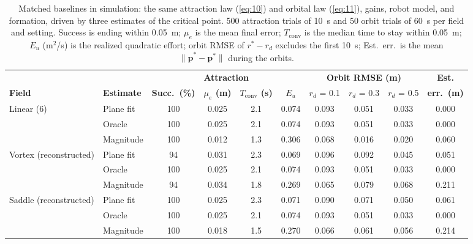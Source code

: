 \begin{table}[!t]
\centering
\footnotesize
\caption{Matched baselines in simulation: the same attraction law (\ref{eq:10}) and orbital law (\ref{eq:11}), gains, robot model, and formation, driven by three estimates of the critical point. 500 attraction trials of 10~s and 50 orbit trials of 60~s per field and setting. Success is ending within 0.05~m; $\mu_e$ is the mean final error; $T_{\mathrm{conv}}$ is the median time to stay within 0.05~m; $E_u$ (m$^2$/s) is the realized quadratic effort; orbit RMSE of $r^* - r_d$ excludes the first 10~s; Est.\ err.\ is the mean $\|\hat{\mathbf{p}}^* - \mathbf{p}^*\|$ during the orbits.}
\label{tab:baselines}
\setlength{\tabcolsep}{2.5pt}
\begin{tabular}{llcccc|ccc|c}
\hline
 & & \multicolumn{4}{c|}{\textbf{Attraction}} & \multicolumn{3}{c|}{\textbf{Orbit RMSE (m)}} & \textbf{Est.} \\
\textbf{Field} & \textbf{Estimate} & \textbf{Succ.\ (\%)} & \textbf{$\mu_e$ (m)} & \textbf{$T_{\mathrm{conv}}$ (s)} & \textbf{$E_u$} & $r_d$ = 0.1 & $r_d$ = 0.3 & $r_d$ = 0.5 & \textbf{err.\ (m)} \\
\hline
Linear (6) & Plane fit & 100 & 0.025 & 2.1 & 0.074 & 0.093 & 0.051 & 0.033 & 0.000 \\
 & Oracle & 100 & 0.025 & 2.1 & 0.074 & 0.093 & 0.051 & 0.033 & 0.000 \\
 & Magnitude & 100 & 0.012 & 1.3 & 0.306 & 0.068 & 0.016 & 0.020 & 0.060 \\
\hline
Vortex (reconstructed) & Plane fit & 94 & 0.031 & 2.3 & 0.069 & 0.096 & 0.092 & 0.045 & 0.051 \\
 & Oracle & 100 & 0.025 & 2.1 & 0.074 & 0.093 & 0.051 & 0.033 & 0.000 \\
 & Magnitude & 94 & 0.034 & 1.8 & 0.269 & 0.065 & 0.079 & 0.068 & 0.211 \\
\hline
Saddle (reconstructed) & Plane fit & 100 & 0.025 & 2.3 & 0.071 & 0.090 & 0.071 & 0.050 & 0.061 \\
 & Oracle & 100 & 0.025 & 2.1 & 0.074 & 0.093 & 0.051 & 0.033 & 0.000 \\
 & Magnitude & 100 & 0.018 & 1.5 & 0.270 & 0.066 & 0.061 & 0.056 & 0.214 \\
\hline
\end{tabular}
\end{table}
